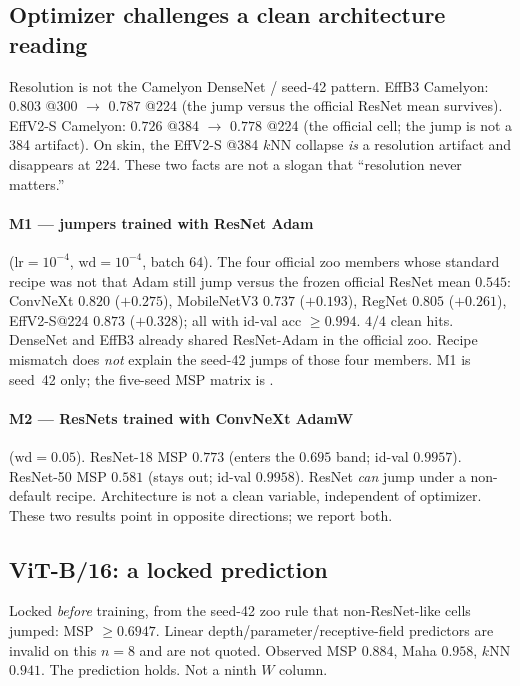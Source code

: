 \documentclass[anon]{midl}
\begin{document}
\subsection{Optimizer challenges a clean architecture reading}
\label{sec:m1m2}

Resolution is not the Camelyon DenseNet / seed-42 pattern.
EffB3 Camelyon: $0.803$ @300 ${\to}$ $0.787$ @224 (the jump versus the official ResNet mean survives).
EffV2-S Camelyon: $0.726$ @384 ${\to}$ $\mathbf{0.778}$ @224 (the official cell; the jump is not a 384 artifact).
On skin, the EffV2-S @384 $k$NN collapse \emph{is} a resolution artifact and disappears at 224.
These two facts are not a slogan that ``resolution never matters.''

\paragraph{M1 --- jumpers trained with ResNet Adam}
($\mathrm{lr}{=}10^{-4}$, $\mathrm{wd}{=}10^{-4}$, batch $64$).
The four official zoo members whose standard recipe was not that Adam still jump versus the frozen official ResNet mean $0.545$:
ConvNeXt $0.820$ ($+0.275$), MobileNetV3 $0.737$ ($+0.193$), RegNet $0.805$ ($+0.261$), EffV2-S@224 $0.873$ ($+0.328$); all with id-val acc ${\ge}0.994$.
$4/4$ clean hits.
DenseNet and EffB3 already shared ResNet-Adam in the official zoo.
Recipe mismatch does \emph{not} explain the seed-42 jumps of those four members.
M1 is seed~42 only; the five-seed MSP matrix is .

\paragraph{M2 --- ResNets trained with ConvNeXt AdamW}
($\mathrm{wd}{=}0.05$).
ResNet-18 MSP $\mathbf{0.773}$ (enters the $0.695$ band; id-val $0.9957$).
ResNet-50 MSP $0.581$ (stays out; id-val $0.9958$).
ResNet \emph{can} jump under a non-default recipe.
Architecture is not a clean variable, independent of optimizer.
These two results point in opposite directions; we report both.

\subsection{ViT-B/16: a locked prediction}

Locked \emph{before} training, from the seed-42 zoo rule that non-ResNet-like cells jumped: MSP ${\ge}0.6947$.
Linear depth/parameter/receptive-field predictors are invalid on this $n{=}8$ and are not quoted.
Observed MSP $\mathbf{0.884}$, Maha $0.958$, $k$NN $0.941$.
The prediction holds.
Not a ninth $W$ column.
\end{document}
